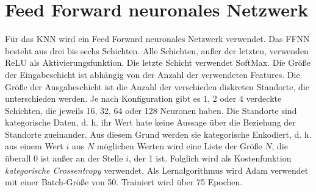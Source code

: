 \section{Feed Forward neuronales Netzwerk}
Für das KNN wird ein Feed Forward neuronales Netzwerk verwendet.
Das FFNN besteht aus drei bis sechs Schichten.
Alle Schichten, außer der letzten, verwenden ReLU als Aktivierungsfunktion.
Die letzte Schicht verwendet SoftMax.
\newline
\newline
Die Größe der Eingabeschicht ist abhängig von der Anzahl der verwendeten Features.
Die Größe der Ausgabeschicht ist die Anzahl der verschieden diskreten Standorte, die unterschieden werden.
Je nach Konfiguration gibt es 1, 2 oder 4 verdeckte Schichten, die jeweils 16, 32, 64 oder 128 Neuronen haben.
\newline
\newline
Die Standorte sind kategorische Daten, d. h. ihr Wert hate keine Aussage über die Beziehung der Standorte zueinander.
Aus diesem Grund werden sie kategorische Enkodiert, d. h. aus einem Wert $i$ aus $N$ möglichen Werten wird eine Liste der Größe $N$,
die überall 0 ist außer an der Stelle $i$, der 1 ist.
Folglich wird als Kostenfunktion \textit{kategorische Crossentropy} verwendet.
\newline
\newline
Als Lernalgorithmus wird Adam verwendet mit einer Batch-Größe von 50.
Trainiert wird über 75 Epochen.

\iffalse
\begin{itemize}
    \item Braucht man mehr Neuronen/Hidden Layer mit steigender Ort Anzahl?
\end{itemize}
\fi
